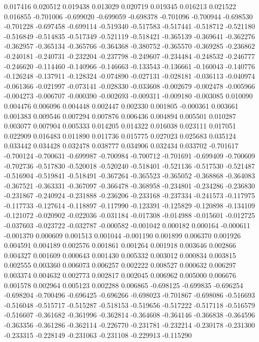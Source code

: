 0.017416
0.020512
0.019438
0.013029
0.020719
0.019345
0.016213
0.021522
0.016855
-0.701006
-0.699020
-0.699059
-0.698378
-0.701096
-0.700944
-0.698530
-0.701228
-0.697458
-0.699114
-0.519340
-0.517583
-0.517441
-0.518712
-0.521180
-0.516849
-0.514835
-0.517349
-0.521119
-0.518421
-0.365139
-0.369641
-0.362276
-0.362957
-0.365134
-0.365766
-0.364368
-0.380752
-0.365570
-0.369285
-0.236862
-0.240181
-0.240731
-0.232204
-0.237798
-0.249607
-0.234484
-0.248532
-0.246777
-0.246620
-0.114460
-0.140966
-0.146663
-0.133543
-0.136661
-0.160043
-0.140776
-0.126248
-0.137911
-0.128324
-0.074890
-0.027131
-0.028181
-0.036113
-0.040974
-0.061366
-0.021997
-0.073141
-0.028330
-0.033608
-0.002679
-0.002478
-0.005966
-0.004273
-0.006707
-0.000390
-0.002693
-0.009311
-0.009180
-0.003085
0.010090
0.004476
0.006096
0.004448
0.002447
0.002330
0.001805
-0.000361
0.003661
0.001383
0.009546
0.007294
0.007876
0.006436
0.004894
0.005501
0.010287
0.003077
0.007904
0.005333
0.014205
0.014322
0.016038
0.023111
0.017051
0.022909
0.016483
0.011890
0.011736
0.015775
0.027023
0.025683
0.035124
0.033442
0.034428
0.032478
0.038777
0.034906
0.032434
0.033702
-0.701617
-0.700124
-0.700631
-0.699987
-0.700984
-0.700712
-0.701691
-0.699409
-0.700609
-0.702736
-0.517830
-0.520018
-0.520240
-0.518401
-0.521136
-0.517530
-0.521487
-0.516904
-0.519841
-0.518491
-0.367264
-0.365523
-0.365052
-0.368868
-0.364083
-0.367521
-0.363331
-0.367097
-0.366478
-0.368958
-0.234801
-0.234286
-0.236830
-0.231867
-0.240924
-0.231888
-0.236206
-0.233168
-0.237334
-0.241573
-0.117975
-0.117733
-0.127614
-0.118897
-0.117990
-0.123391
-0.125829
-0.120898
-0.134109
-0.121072
-0.020902
-0.022036
-0.031184
-0.017308
-0.014988
-0.015601
-0.012725
-0.037603
-0.023722
-0.032787
-0.000582
-0.001042
0.000182
0.000164
-0.000611
-0.001370
0.000609
0.001513
0.001044
-0.001190
0.001899
0.006370
0.001926
0.004591
0.004189
0.002576
0.001861
0.001264
0.001918
0.003646
0.002866
0.004327
0.001609
0.000643
0.001430
0.005332
0.003012
0.000834
0.003815
0.002555
0.003360
0.006073
0.006257
0.002222
0.008527
0.000632
0.006297
0.003374
0.004632
0.002773
0.002817
0.002045
0.006962
0.005000
0.006676
0.001578
0.002964
0.005123
0.002288
0.006865
-0.698125
-0.699835
-0.696254
-0.698204
-0.700496
-0.696425
-0.696266
-0.698023
-0.701867
-0.698086
-0.516693
-0.516048
-0.515717
-0.515287
-0.518153
-0.519656
-0.517222
-0.517118
-0.516579
-0.516607
-0.361682
-0.361996
-0.362814
-0.364608
-0.364146
-0.366838
-0.364596
-0.363356
-0.361286
-0.362114
-0.226770
-0.231781
-0.232214
-0.230178
-0.231300
-0.233315
-0.228149
-0.231063
-0.231108
-0.229913
-0.115290
